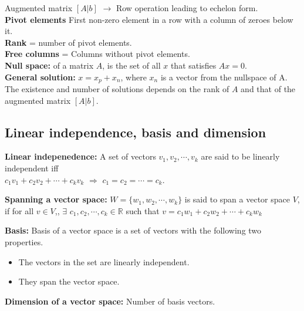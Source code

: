 Augmented matrix $[A|b]$ $\rightarrow$ Row operation leading to echelon form.\\
\textbf{Pivot elements} First non-zero element in a row with a column of zeroes below it.\\
\textbf{Rank} = number of pivot elements.\\
\textbf{Free columns} = Columns without pivot elements.\\
\textbf{Null space:} of a matrix $A$, is the set of all $x$ that satisfies $Ax = 0$.\\
\textbf{General solution:} $x = x_p + x_n$, where $x_n$ is a vector from the nullspace of A.\\
The existence and number of solutions depends on the rank of $A$ and that of the augmented matrix $[A|b]$.\\


\subsection{Linear independence, basis and dimension}

\textbf{Linear indepenedence:} A set of vectors $v_1, v_2, \cdots, v_k$ are said to be linearly independent iff\\
$c_1v_1 + c_2v_2 + \cdots + c_kv_k$ $\Rightarrow$ $c_1 = c_2 = \cdots = c_k$.

\vspace{6pt}


\textbf{Spanning a vector space:} $W = \{w_1, w_2, \cdots, w_k\}$ is said to span a vector space $V$, if for all $v \in V$,, $\exists$ $c_1, c_2, \cdots, c_k \in \mathbb{R}$ such that $v = c_1w_1 + c_2w_2 + \cdots + c_kw_k$

\textbf{Basis:} Basis of a vector space is a set of vectors with the following two properties.\\
\begin{itemize}
	\item The vectors in the set are linearly independent.
	\item They span the vector space.
\end{itemize}

\textbf{Dimension of a vector space:} Number of basis vectors.

